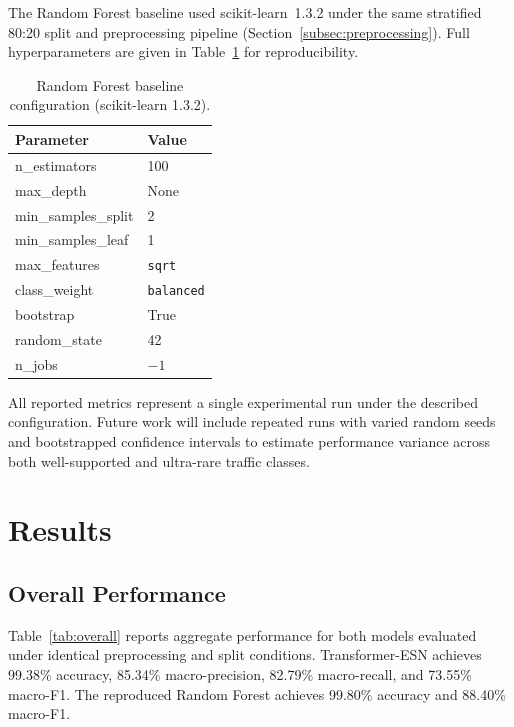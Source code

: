 \documentclass[5p,times]{elsarticle}
\begin{document}
	The Random Forest baseline used scikit-learn~1.3.2 under the same
	stratified 80:20 split and preprocessing pipeline
	(Section~\ref{subsec:preprocessing}). Full hyperparameters are given
	in Table~\ref{tab:rf_config} for reproducibility.
	
	\begin{table}[!htbp]
		\centering
		\caption{Random Forest baseline configuration (scikit-learn 1.3.2).}
		\label{tab:rf_config}
		\renewcommand{\arraystretch}{0.9}
		\setlength{\tabcolsep}{5pt}
		\begin{tabularx}{\linewidth}{l X}
			\toprule
			\textbf{Parameter} & \textbf{Value} \\
			\midrule
			n\_estimators       & 100 \\
			max\_depth          & None \\
			min\_samples\_split & 2 \\
			min\_samples\_leaf  & 1 \\
			max\_features       & \texttt{sqrt} \\
			class\_weight       & \texttt{balanced} \\
			bootstrap           & True \\
			random\_state       & 42 \\
			n\_jobs             & $-1$ \\
			\bottomrule
		\end{tabularx}
	\end{table}
	
	All reported metrics represent a single experimental run under the
	described configuration. Future work will include repeated runs with
	varied random seeds and bootstrapped confidence intervals to estimate
	performance variance across both well-supported and ultra-rare
	traffic classes.
	\section{Results}
	\label{sec:results}
	
	\subsection{Overall Performance}
	\label{subsec:overall}
	
	Table~\ref{tab:overall} reports aggregate performance for both models
	evaluated under identical preprocessing and split conditions.
	Transformer-ESN achieves 99.38\% accuracy, 85.34\% macro-precision,
	82.79\% macro-recall, and 73.55\% macro-F1. The reproduced Random Forest
	achieves 99.80\% accuracy and 88.40\% macro-F1.
	
\end{document}
